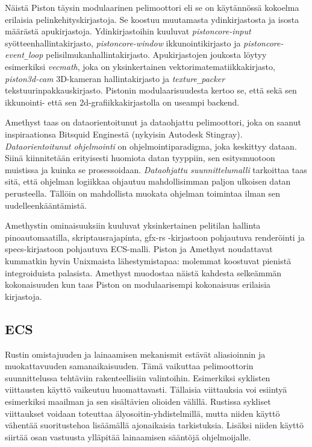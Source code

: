 \documentclass[finnish]{tktltiki2}
\theoremstyle{definition}
\theoremstyle{remark}
\begin{document}
Näistä Piston täysin modulaarinen pelimoottori eli se on käytännössä kokoelma erilaisia pelinkehityskirjastoja. Se koostuu muutamasta ydinkirjastosta ja isosta määrästä apukirjastoja. Ydinkirjastoihin kuuluvat \textit{pistoncore-input} syötteenhallintakirjasto, \textit{pistoncore-window} ikkunointikirjasto ja \textit{pistoncore-event\texttt{\_}loop} pelisilmukanhallintakirjasto. Apukirjastojen joukosta löytyy esimerkiksi \textit{vecmath}, joka on yksinkertainen vektorimatematiikkakirjasto, \textit{piston3d-cam} 3D-kameran hallintakirjasto ja \textit{texture\texttt{\_}packer} tekstuurinpakkauskirjasto. Pistonin modulaarisuudesta kertoo se, että sekä sen ikkunointi- että sen 2d-grafiikkakirjastolla on useampi backend.

Amethyst\cite{Amethyst} taas on dataorientoitunut ja dataohjattu pelimoottori, joka on saanut inspiraationsa Bitsquid Enginestä (nykyisin Autodesk Stingray)\cite{AmethystReadme}. \textit{Dataorientoitunut ohjelmointi} on ohjelmointiparadigma, joka keskittyy dataan. Siinä kiinnitetään erityisesti huomiota datan tyyppiin, sen esitysmuotoon muistissa ja kuinka se prosessoidaan. \textit{Dataohjattu suunnittelumalli} tarkoittaa taas sitä, että ohjelman logiikkaa ohjautuu mahdollisimman paljon ulkoisen datan perusteella. Tällöin on mahdollista muokata ohjelman toimintaa ilman sen uudelleenkääntämistä. \cite{AmethystGlossary}

Amethystin ominaisuuksiin kuuluvat yksinkertainen pelitilan hallinta pinoautomaatilla, skriptausrajapinta, gfx-rs -kirjastoon pohjautuva renderöinti ja specs-kirjastoon pohjautuva ECS-malli. Piston ja Amethyst noudattavat kummatkin hyvin Unixmaista lähestymistapaa: molemmat koostuvat pienistä integroiduista palasista. Amethyst muodostaa näistä kahdesta selkeämmän kokonaisuuden kun taas Piston on modulaarisempi kokonaisuus erilaisia kirjastoja.

\subsection{ECS}
Rustin omistajuuden ja lainaamisen mekanismit estävät aliasioinnin ja muokattavuuden samanaikaisuuden. Tämä vaikuttaa pelimoottorin suunnittelussa tehtäviin rakenteellisiin valintoihin. Esimerkiksi syklisten viittausten käyttö vaikeutuu huomattavasti. Tällaisia viittauksia voi esiintyä esimerkiksi maailman ja sen sisältävien olioiden välillä. Rustissa sykliset viittaukset voidaan toteuttaa älyosoitin-yhdistelmillä, mutta niiden käyttö vähentää suoritustehoa lisäämällä ajonaikaisia tarkistuksia. Lisäksi niiden käyttö siirtää osan vastuusta ylläpitää lainaamisen sääntöjä ohjelmoijalle.
\end{document}
